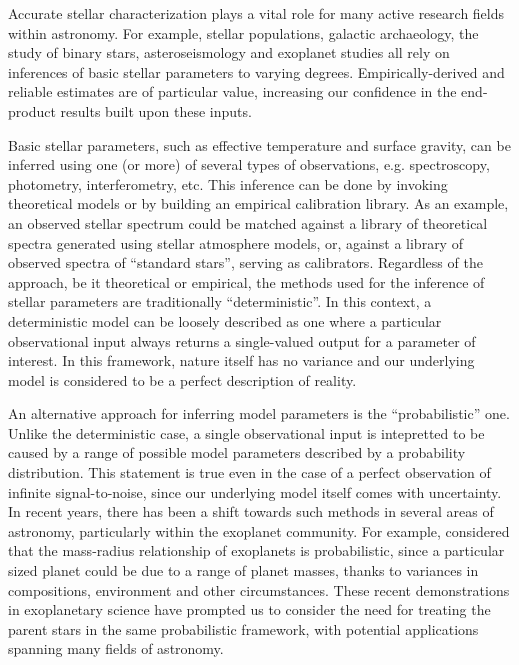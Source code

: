 


Accurate stellar characterization plays a vital role for many active research 
fields within astronomy. For example, stellar populations, galactic archaeology, 
the study of binary stars, asteroseismology and exoplanet studies all rely on 
inferences of basic stellar parameters to varying degrees. Empirically-derived
and reliable estimates are of particular value, increasing our confidence in the
end-product results built upon these inputs. 

Basic stellar parameters, such as effective temperature and surface gravity, 
can be inferred using one (or more) of several types of observations, e.g. 
spectroscopy, photometry, interferometry, etc. This inference can be done by
invoking theoretical models or by building an empirical calibration library.
As an example, an observed stellar spectrum could be matched against a library of 
theoretical spectra generated using stellar atmosphere models, or, against a 
library of observed spectra of ``standard stars'', serving as calibrators.
Regardless of the approach, be it theoretical or empirical, the methods used
for the inference of stellar parameters are traditionally ``deterministic''.
In this context, a deterministic model can be loosely described as one where
a particular observational input always returns a single-valued output for a 
parameter of interest. In this framework, nature itself has no variance and
our underlying model is considered to be a perfect description of reality.

An alternative approach for inferring model parameters is the 
``probabilistic'' one. Unlike the deterministic case, a single observational 
input is intepretted to be caused by a range of possible model parameters
described by a probability distribution. This statement is true even in the case
of a perfect observation of infinite signal-to-noise, since our underlying 
model itself comes with uncertainty. In recent years, there has been a shift 
towards such methods in several areas of astronomy, particularly within the 
exoplanet community. For example, \citet{wolfgang:2015} considered that
the mass-radius relationship of exoplanets is probabilistic, since a particular
sized planet could be due to a range of planet masses, thanks to variances in
compositions, environment and other circumstances. These recent demonstrations
in exoplanetary science have prompted us to consider the need for treating the 
parent stars in the same probabilistic framework, with potential applications 
spanning many fields of astronomy.

